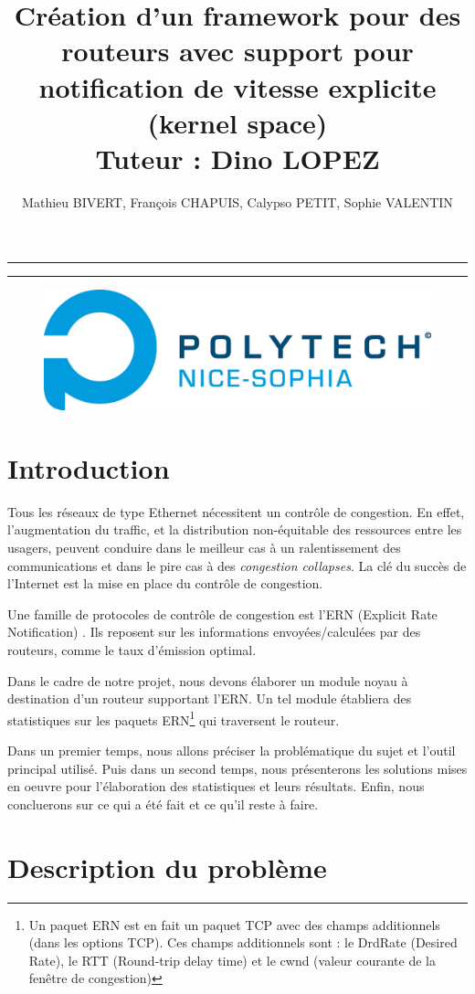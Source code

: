 \documentclass[a4paper]{article}
\title{Création d'un framework pour des routeurs
	avec support pour notification de vitesse explicite
	(kernel space)\\Tuteur : Dino LOPEZ}
\author{Mathieu BIVERT, François CHAPUIS, Calypso PETIT, Sophie VALENTIN}
\makeatletter
\def\maketitle{%
  \null
  \thispagestyle{empty}%
  \vskip 1cm
  \begin{center}
        \normalfont\large\@author
  \end{center}
  \vfil
  \vfil
  \vfil
  \vfil
  \vfil
  \vfil
  \vfil
  \vfil
  \vfil
  \hrule height 2pt
  \par
  \begin{center}
        \huge \strut \@title \par
        \@date
  \end{center}
  \hrule height 2pt
  \par
  \vfil
  \vfil
  \vfil
  \vfil
  \vfil
  \vfil
  \vfil  
  \vfil  
  \vfil
  \vfil  
  \vfil
  \vfil
  \vfil
  \vfil  
  \vfil  
  \vfil
  \vfil  
  \vfil  
  \vfil
  \vfil
  \vfil
  \vfil
  \vfil
  \vfil
  \vfil
  \null
\begin{figure}[!ht]
        \centering
        \includegraphics[scale=.5]{polytech.png}
\end{figure}
\vfil
\cleardoublepage
}
\makeatother
\begin{document}
\maketitle

\newpage
\tableofcontents

\newpage
\section{Introduction}

Tous les réseaux de type Ethernet nécessitent un contrôle de congestion. En effet,
l'augmentation du traffic, et la distribution non-équitable des ressources 
entre les usagers, peuvent conduire dans le meilleur cas à un
ralentissement des communications et dans le pire cas à des \textit{congestion collapses}.
La clé du succès de l'Internet est la mise en place du contrôle de congestion.

Une famille de protocoles de contrôle de congestion est l'ERN
(Explicit Rate Notification) \cite{thesis1}. Ils reposent sur les informations
envoyées/calculées par des routeurs, comme le taux d'émission
optimal. 

Dans le cadre de notre projet, nous devons élaborer un
module noyau à destination d'un routeur supportant l'ERN.
Un tel module établiera des statistiques sur les paquets ERN\footnote{Un paquet ERN est en fait 
un paquet TCP avec des champs additionnels (dans les options TCP). Ces champs additionnels sont : 
le DrdRate (Desired Rate), le RTT (Round-trip delay time) et le cwnd (valeur courante de la fenêtre de congestion)}
qui traversent le routeur. 

Dans un premier temps, nous allons préciser
la problématique du sujet et l'outil principal utilisé. Puis dans un
second temps, nous présenterons les solutions mises en oeuvre pour 
l'élaboration des statistiques et leurs résultats. Enfin, nous concluerons sur ce qui a été fait
et ce qu'il reste à faire.

\section{Description du problème}
\end{document}
